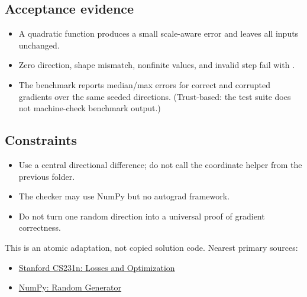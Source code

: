         \subsection{Acceptance evidence}

        \begin{evidencebox}
        \begin{itemize}
          \item A quadratic function produces a small scale-aware error and leaves all inputs unchanged.
  \item Zero direction, shape mismatch, nonfinite values, and invalid step fail with .
  \item The benchmark reports median/max errors for correct and corrupted gradients over the same seeded directions. (Trust-based: the test suite does not machine-check benchmark output.)
        \end{itemize}
        \end{evidencebox}

        \subsection{Constraints}

        \begin{itemize}
          \item Use a central directional difference; do not call the coordinate helper from the previous folder.
  \item The checker may use NumPy but no autograd framework.
  \item Do not turn one random direction into a universal proof of gradient correctness.
        \end{itemize}

        \begin{sourcebox}
        This is an atomic adaptation, not copied solution code. Nearest primary sources:
        \begin{itemize}
          \item \href{https://cs231n.github.io/optimization-1/}{Stanford CS231n: Losses and Optimization}
  \item \href{https://numpy.org/doc/stable/reference/random/generator.html}{NumPy: Random Generator}
        \end{itemize}
        \end{sourcebox}

